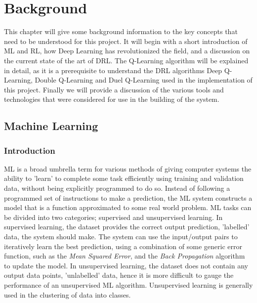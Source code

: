 \chapter{Background}
This chapter will give some background information to the key concepts that need to be understood
for this project. It will begin with a short introduction of ML and RL, how Deep Learning has
revolutionized the field, and a discussion on the current state of the art of DRL. The Q-Learning
algorithm will be explained in detail, as it is a prerequisite to understand the DRL algorithms Deep
Q-Learning, Double Q-Learning and Duel Q-Learning used in the implementation of this project.
Finally we will provide a discussion of the various tools and technologies that were considered for
use in the building of the system.

\section{Machine Learning}
\subsection{Introduction}
ML is a broad umbrella term for various methods of giving computer systems the ability to 'learn' to
complete some task efficiently using training and validation data, without being explicitly
programmed to do so. Instead of following a programmed set of instructions to make a prediction, the
ML system constructs a model that is a function approximated to some real world problem. ML tasks
can be divided into two categories; supervised and unsupervised learning. In supervised learning,
the dataset provides the correct output prediction, 'labelled' data, the system should make. The
system can use the input/output pairs to iteratively learn the best prediction, using a combination
of some generic error function, such as the \textit{Mean Squared Error}, and the \textit{Back
    Propagation} algorithm \cite{chauvin-bp} to update the model. In unsupervised learning, the dataset
does not contain any output data points, 'unlabelled' data, hence it is more difficult to gauge the
performance of an unsupervised ML algorithm. Unsupervised learning is generally used in the
clustering of data into classes. \paragraph{}

